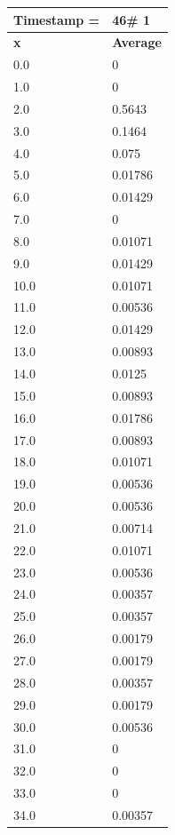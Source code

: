 \begin{tabular}{|l||l|}
\hline
\textbf{Timestamp =} & \textbf{46}\# 1\\\hline
	\textbf{x} & \textbf{Average} \\ \hline
\hline
	0.0 & 0 \\ \hline
	1.0 & 0 \\ \hline
	2.0 & 0.5643 \\ \hline
	3.0 & 0.1464 \\ \hline
	4.0 & 0.075 \\ \hline
	5.0 & 0.01786 \\ \hline
	6.0 & 0.01429 \\ \hline
	7.0 & 0 \\ \hline
	8.0 & 0.01071 \\ \hline
	9.0 & 0.01429 \\ \hline
	10.0 & 0.01071 \\ \hline
	11.0 & 0.00536 \\ \hline
	12.0 & 0.01429 \\ \hline
	13.0 & 0.00893 \\ \hline
	14.0 & 0.0125 \\ \hline
	15.0 & 0.00893 \\ \hline
	16.0 & 0.01786 \\ \hline
	17.0 & 0.00893 \\ \hline
	18.0 & 0.01071 \\ \hline
	19.0 & 0.00536 \\ \hline
	20.0 & 0.00536 \\ \hline
	21.0 & 0.00714 \\ \hline
	22.0 & 0.01071 \\ \hline
	23.0 & 0.00536 \\ \hline
	24.0 & 0.00357 \\ \hline
	25.0 & 0.00357 \\ \hline
	26.0 & 0.00179 \\ \hline
	27.0 & 0.00179 \\ \hline
	28.0 & 0.00357 \\ \hline
	29.0 & 0.00179 \\ \hline
	30.0 & 0.00536 \\ \hline
	31.0 & 0 \\ \hline
	32.0 & 0 \\ \hline
	33.0 & 0 \\ \hline
	34.0 & 0.00357 \\ \hline
\end{tabular}
